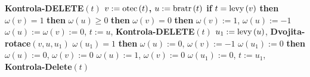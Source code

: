 {\bf Kontrola-DELETE$\left(t\right)$\newline 
$v:=\operatorname{otec}\left(t\right)$, $u:=\operatorname{bratr}\left(t\right)$\newline 
if} $t=\operatorname{levy}\left(v\right)$ {\bf then}\newline 
\phantom{---}{\bf if} $\omega \left(v\right)=1$ {\bf then}\newline 
\phantom{------}{\bf if} $\omega \left(u\right)\ge 0$ {\bf then}\newline 
\phantom{---------}{\bf Rotace$\left(v,u\right)$}\newline 
\phantom{---------}{\bf if} $\omega \left(v\right)=0$ {\bf then}\newline 
\phantom{------------}$\omega \left(v\right):=1$, $\omega \left(u\right):=-1$\newline 
\phantom{---------}{\bf else}\newline 
\phantom{------------}$\omega \left(u\right):=\omega \left(v\right):=0$, $t:=u$, {\bf Kontrola-DELETE}$\left(t\right)$\newline 
\phantom{---------}{\bf endif}\newline 
\phantom{------}{\bf else}\newline 
\phantom{---------}$u_1:=\operatorname{levy}\left(u\right)$, {\bf Dvojita-rotace}$\left(v,u,u_1\right)$\newline 
\phantom{---------}{\bf if} $\omega \left(u_1\right)=1$ {\bf then}\newline 
\phantom{------------}$\omega \left(u\right):=0$, $\omega \left(v\right):=-1$\newline 
\phantom{---------}{\bf else}\newline 
\phantom{------------}{\bf if} $\omega \left(u_1\right):=0$ {\bf then}\newline 
\phantom{---------------}$\omega \left(u\right):=0$, $\omega\left(v\right):=0$\newline 
\phantom{------------}{\bf else}\newline 
\phantom{---------------}$\omega \left(u\right):=1$, $\omega \left(v\right):=0$\newline 
\phantom{------------}{\bf endif}\newline 
\phantom{---------}{\bf endif}\newline 
\phantom{---------}$\omega \left(u_1\right):=0$, $t:=u_1$, {\bf Kontrola-Delete}$\left(t\right)$\newline 
\phantom{------}{\bf endif}\newline 
\phantom{---}{\bf else}\newline 
